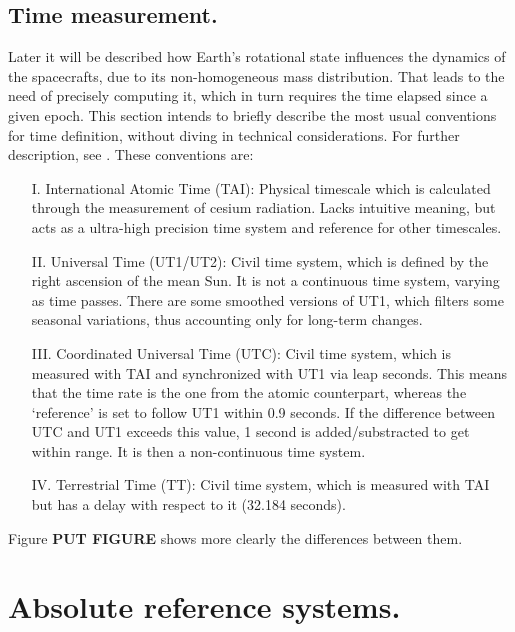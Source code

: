 	\subsection{Time measurement.}
	\indent Later it will be described how Earth's rotational state influences the dynamics of the spacecrafts, due to its non-homogeneous mass distribution. That leads to the need of precisely computing it, which in turn requires the time elapsed since a given epoch. This section intends to briefly describe the most usual conventions for time definition, without diving in technical considerations. For further description, see \cite{Time_handbook}. These conventions are:%
	\begin{itemize}
	\item[I.] International Atomic Time (TAI): Physical timescale which is calculated through the measurement of cesium radiation. Lacks intuitive meaning, but acts as a ultra-high precision time system and reference for other timescales.
	\item[II.] Universal Time (UT1/UT2): Civil time system, which is defined by the right ascension of the mean Sun. It is not a continuous time system, varying as time passes. There are some smoothed versions of UT1, which filters some seasonal variations, thus accounting only for long-term changes. 
	\item[III.] Coordinated Universal Time (UTC): Civil time system, which is measured with TAI and synchronized with UT1 via leap seconds. This means that the time rate is the one from the atomic counterpart, whereas the `reference' is set to follow UT1 within 0.9 seconds. If the difference between UTC and UT1 exceeds this value, 1 second is added/substracted to get within range. It is then a non-continuous time system.
	\item[IV.] Terrestrial Time (TT): Civil time system, which is measured with TAI but has a delay with respect to it (32.184 seconds).
	\end{itemize}
	\indent Figure \textbf{PUT FIGURE} shows more clearly the differences between them.
% 
\section{Absolute reference systems.}
%
